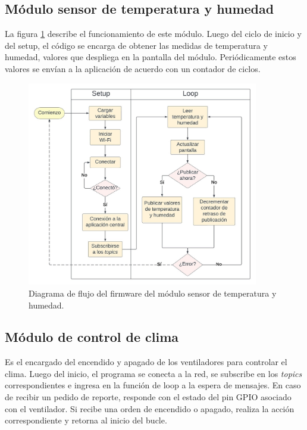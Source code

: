\pagebreak
\subsection{Módulo sensor de temperatura y humedad}
\label{Módulo sensor de temperatura y humedad}

La figura \ref{fig:flow_tempsensor} describe el funcionamiento de este módulo. Luego del ciclo de inicio y del setup, el código se encarga de obtener las medidas de temperatura y humedad, valores que despliega en la pantalla del módulo. Periódicamente estos valores se envían a la aplicación de acuerdo con un contador de ciclos. 


\begin{figure}[!h]
	\centering
	\includegraphics[width=0.9\textwidth]{./Figures/chapter3/FirmwareTempSensor.jpg}
	\caption[Diagrama de flujo del firmware del módulo sensor de temperatura y humedad]{Diagrama de flujo del firmware del módulo sensor de temperatura y humedad.}
	\label{fig:flow_tempsensor}
\end{figure}




\subsection{Módulo de control de clima}
\label{Módulo de control de clima}

Es el encargado del encendido y apagado de los ventiladores para controlar el clima.
Luego del inicio, el programa se conecta a la red, se subscribe en los \textit{topics} correspondientes e ingresa en la función de loop a la espera de mensajes. En caso de recibir un pedido de reporte, responde con el estado del pin GPIO asociado con el ventilador. Si recibe una orden de encendido o apagado, realiza la acción correspondiente y retorna al inicio del bucle.

